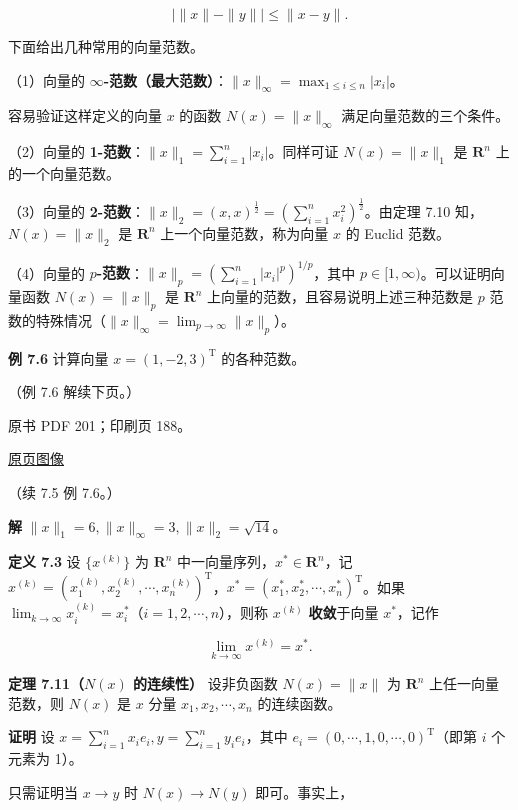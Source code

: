 \documentclass[
  10pt,
  fontset=fandol]{ctexart}
\begin{document}
\[
\big|\|x\|-\|y\|\big|\leqslant\|x-y\|.
\tag{7.5.2}
\]

下面给出几种常用的向量范数。

（1）向量的
\textbf{\(\infty\)-范数（最大范数）}：\(\|x\|_\infty=\max_{1\leqslant i\leqslant n}|x_i|\)。

容易验证这样定义的向量 \(x\) 的函数 \(N(x)=\|x\|_\infty\)
满足向量范数的三个条件。

（2）向量的 \textbf{1-范数}：\(\|x\|_1=\sum_{i=1}^{n}|x_i|\)。同样可证
\(N(x)=\|x\|_1\) 是 \(\mathbf R^n\) 上的一个向量范数。

（3）向量的
\textbf{2-范数}：\(\|x\|_2=(x,x)^{\frac12}=\left(\sum_{i=1}^{n}x_i^2\right)^{\frac12}\)。由定理
7.10 知，\(N(x)=\|x\|_2\) 是 \(\mathbf R^n\) 上一个向量范数，称为向量
\(x\) 的 Euclid 范数。

（4）向量的
\textbf{\(p\)-范数}：\(\|x\|_p=\left(\sum_{i=1}^{n}|x_i|^p\right)^{1/p}\)，其中
\(p\in[1,\infty)\)。可以证明向量函数 \(N(x)=\|x\|_p\) 是 \(\mathbf R^n\)
上向量的范数，且容易说明上述三种范数是 \(p\)
范数的特殊情况（\(\|x\|_\infty=\lim_{p\to\infty}\|x\|_p\)）。

\textbf{例 7.6} 计算向量 \(x=(1,-2,3)^{\mathrm T}\) 的各种范数。

（例 7.6 解续下页。）

\clearpage

原书 PDF 201；印刷页 188。

\href{/Users/xiangjunfeng/Desktop/数值计算专用/numerical-analysis/book/source-images/pdf-201.jpeg}{原页图像}

（续 7.5 例 7.6。）

\textbf{解} \(\|x\|_1=6,\|x\|_\infty=3,\|x\|_2=\sqrt{14}\)。

\textbf{定义 7.3} 设 \(\{x^{(k)}\}\) 为 \(\mathbf R^n\)
中一向量序列，\(x^*\in\mathbf R^n\)，记
\(x^{(k)}=(x_1^{(k)},x_2^{(k)},\cdots,x_n^{(k)})^{\mathrm T}\)，\(x^*=(x_1^*,x_2^*,\cdots,x_n^*)^{\mathrm T}\)。如果
\(\lim_{k\to\infty}x_i^{(k)}=x_i^*\)（\(i=1,2,\cdots,n\)），则称
\(x^{(k)}\) \textbf{收敛}于向量 \(x^*\)，记作

\[
\lim_{k\to\infty}x^{(k)}=x^*.
\]

\textbf{定理 7.11（\(N(x)\) 的连续性）} 设非负函数 \(N(x)=\|x\|\) 为
\(\mathbf R^n\) 上任一向量范数，则 \(N(x)\) 是 \(x\) 分量
\(x_1,x_2,\cdots,x_n\) 的连续函数。

\textbf{证明} 设 \(x=\sum_{i=1}^{n}x_ie_i,y=\sum_{i=1}^{n}y_ie_i\)，其中
\(e_i=(0,\cdots,1,0,\cdots,0)^{\mathrm T}\)（即第 \(i\) 个元素为 1）。

只需证明当 \(x\to y\) 时 \(N(x)\to N(y)\) 即可。事实上，
\end{document}
